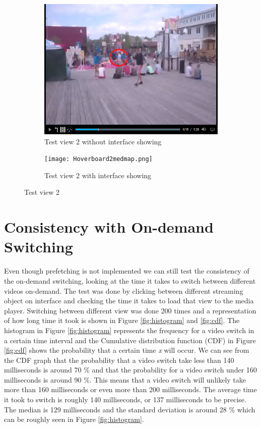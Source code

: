 \begin{figure}
\begin{subfigure}[b]{0.5\textwidth}
 	\includegraphics[width=\linewidth]{Hoverboard_2.png}
  	\caption{Test view 2 without interface showing}\label{fig:testview2A}
    \end{subfigure}\hfill 
    \hspace{3px}
    \begin{subfigure}[b]{0.5\textwidth}
	 \texttt{[image: Hoverboard2medmap.png]}
 	\caption{Test view 2 with interface showing}\label{fig:testview2B}
    \end{subfigure}
	\caption{Test view 2}
	\label{fig:testview2}
\end{figure}

\section{Consistency with On-demand Switching}
Even though prefetching is not implemented we can still test the consistency of the on-demand switching, looking at the time it takes to switch between different videos on-demand. The test was done by clicking between different streaming object on interface and checking the time it takes to load that view to the media player. Switching between different view was done 200 times and a representation of how long time it took is shown in Figure \ref{fig:histogram} and \ref{fig:cdf}. The histogram in Figure \ref{fig:histogram} represents the frequency for a video switch in a certain time interval and the Cumulative distribution function (CDF) in Figure \ref{fig:cdf} shows the probability that a certain time \textit{x} will occur. We can see from the CDF graph that the probability that a video switch take less than 140 milliseconds is around 70 $\%$ and that the probability for a video switch under 160 milliseconds is around 90 $\%$. This means that a video switch will unlikely  take more than 160 milliseconds or even more than 200 milliseconds. The average time it took to switch is roughly 140 milliseconds, or 137 milliseconds to be precise. The median is 129 milliseconds and the standard deviation is around 28 $\%$ which can be roughly seen in Figure \ref{fig:histogram}.


